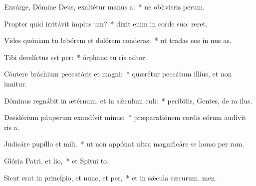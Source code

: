 \item Exsúrge, Dómine Deus, exaltétur manus a:~* ne oblivisris perum.
\item Propter quid irritávit ímpius um?~* dixit enim in corde suo:  reret.
\item Vides quóniam tu labórem et dolórem conderas:~* ut tradas eos in nus as.
\item Tibi derelíctus est per:~* órphano tu ris adtor.
\item Cóntere bráchium peccatóris et magni:~* quærétur peccátum illíus, et non innitur.
\item Dóminus regnábit in ætérnum, et in sǽculum culi:~* períbitis, Gentes, de ra ilus.
\item Desidérium páuperum exaudívit minus:~* præparatiónem cordis eórum audívit ris a.
\item Judicáre pupíllo et mili,~* ut non appónat ultra magnificáre se homo per ram.
\item Glória Patri, et lio,~* et Spitui to.
\item Sicut erat in princípio, et nunc, et per,~* et in sǽcula sæcurum. men.
